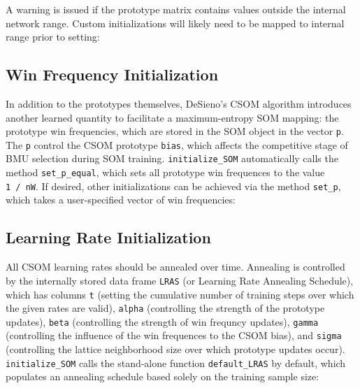 \documentclass[]{article}
\newenvironment{Shaded}{\begin{snugshade}}{\end{snugshade}}
\newcommand{\KeywordTok}[1]{\textcolor[rgb]{0.13,0.29,0.53}{\textbf{#1}}}
\newcommand{\NormalTok}[1]{#1}
\newcommand{\OperatorTok}[1]{\textcolor[rgb]{0.81,0.36,0.00}{\textbf{#1}}}
\newcommand{\StringTok}[1]{\textcolor[rgb]{0.31,0.60,0.02}{#1}}
\begin{document}
A warning is issued if the prototype matrix contains values outside the internal network range. Custom initializations will likely need to be mapped to internal range prior to setting:

\begin{Shaded}
\end{Shaded}

\hypertarget{win-frequency-initialization}{%
\subsection{Win Frequency Initialization}\label{win-frequency-initialization}}

In addition to the prototypes themselves, DeSieno's CSOM algorithm introduces another learned quantity to facilitate a maximum-entropy SOM mapping: the prototype win frequencies, which are stored in the SOM object in the vector \texttt{p}. The \texttt{p} control the CSOM prototype \texttt{bias}, which affects the competitive stage of BMU selection during SOM training. \texttt{initialize\_SOM} automatically calls the method \texttt{set\_p\_equal}, which sets all prototype win frequences to the value \texttt{1\ /\ nW}. If desired, other initializations can be achieved via the method \texttt{set\_p}, which takes a user-specified vector of win frequencies:

\begin{Shaded}
\end{Shaded}

\hypertarget{learning-rate-initialization}{%
\subsection{Learning Rate Initialization}\label{learning-rate-initialization}}

All CSOM learning rates should be annealed over time. Annealing is controlled by the internally stored data frame \texttt{LRAS} (or Learning Rate Annealing Schedule), which has columns \texttt{t} (setting the cumulative number of training steps over which the given rates are valid), \texttt{alpha} (controlling the strength of the prototype updates), \texttt{beta} (controlling the strength of win frequncy updates), \texttt{gamma} (controlling the influence of the win frequences to the CSOM bias), and \texttt{sigma} (controlling the lattice neighborhood size over which prototype updates occur). \texttt{initialize\_SOM} calls the stand-alone function \texttt{default\_LRAS} by default, which populates an annealing schedule based solely on the training sample size:
\end{document}
